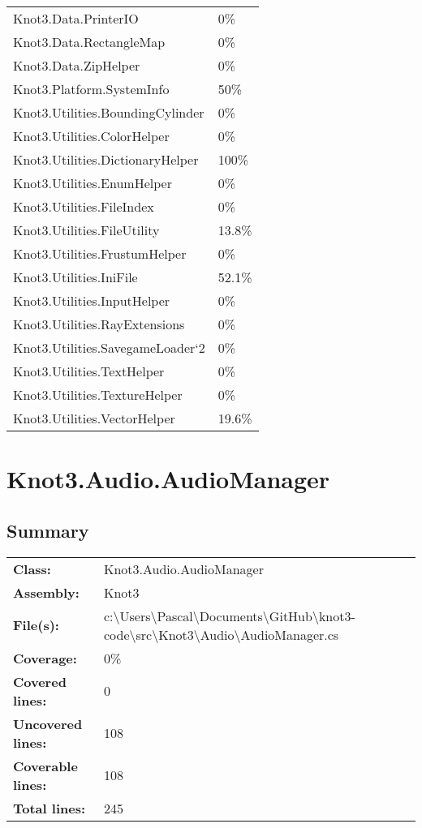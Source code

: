 \documentclass[a4paper,10pt]{article}
\begin{document}
\begin{longtable}[l]{ll}
Knot3.Data.PrinterIO & 0\%\\
Knot3.Data.RectangleMap & 0\%\\
Knot3.Data.ZipHelper & 0\%\\
Knot3.Platform.SystemInfo & 50\%\\
Knot3.Utilities.BoundingCylinder & 0\%\\
Knot3.Utilities.ColorHelper & 0\%\\
Knot3.Utilities.DictionaryHelper & 100\%\\
Knot3.Utilities.EnumHelper & 0\%\\
Knot3.Utilities.FileIndex & 0\%\\
Knot3.Utilities.FileUtility & 13.8\%\\
Knot3.Utilities.FrustumHelper & 0\%\\
Knot3.Utilities.IniFile & 52.1\%\\
Knot3.Utilities.InputHelper & 0\%\\
Knot3.Utilities.RayExtensions & 0\%\\
Knot3.Utilities.SavegameLoader`2 & 0\%\\
Knot3.Utilities.TextHelper & 0\%\\
Knot3.Utilities.TextureHelper & 0\%\\
Knot3.Utilities.VectorHelper & 19.6\%\\
\end{longtable}
\newpage
\section{Knot3.Audio.AudioManager}
\subsection{Summary}
\begin{longtable}[l]{ll}
\textbf{Class:} & Knot3.Audio.AudioManager\\
\textbf{Assembly:} & Knot3\\
\textbf{File(s):} & \begin{minipage}[t]{12cm}{c:\textbackslash Users\textbackslash Pascal\textbackslash Documents\textbackslash GitHub\textbackslash knot3-code\textbackslash src\textbackslash Knot3\textbackslash Audio\textbackslash AudioManager.cs}\end{minipage} \\
\textbf{Coverage:} & 0\%\\
\textbf{Covered lines:} & 0\\
\textbf{Uncovered lines:} & 108\\
\textbf{Coverable lines:} & 108\\
\textbf{Total lines:} & 245\\
\end{longtable}
\end{document}
